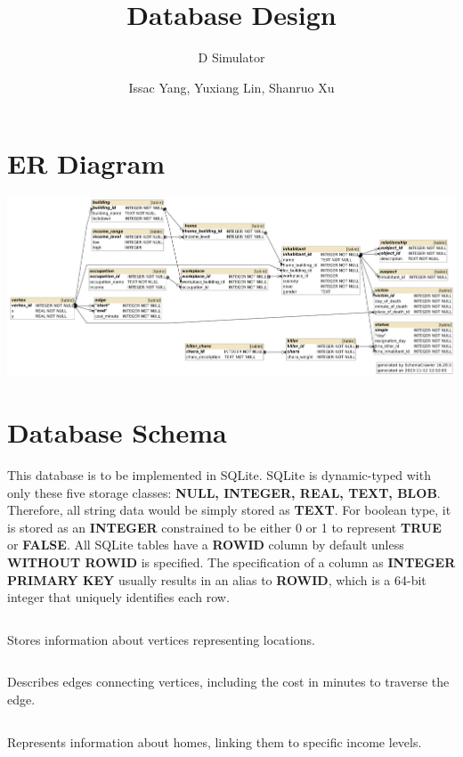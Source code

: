 \documentclass{llncs}
\begin{document}
\title{Database Design}
\subtitle{D Simulator}
\author{Issac Yang, Yuxiang Lin, Shanruo Xu}

\maketitle

\section{ER Diagram}

\includegraphics[width=\textwidth]{diagram.png}

\section{Database Schema}

This database is to be implemented in SQLite. SQLite is dynamic-typed with only these five storage classes: \textbf{NULL, INTEGER, REAL, TEXT, BLOB}. Therefore, all string data would be simply stored as \textbf{TEXT}. For boolean type, it is stored as an \textbf{INTEGER} constrained to be either 0 or 1 to represent \textbf{TRUE} or \textbf{FALSE}. All SQLite tables have a \textbf{ROWID} column by default unless \textbf{WITHOUT ROWID} is specified. The specification of a column as \textbf{INTEGER PRIMARY KEY} usually results in an alias to \textbf{ROWID}, which is a 64-bit integer that uniquely identifies each row.

\inputminted[firstline=1,lastline=6]{sql}{DDL.sql}
Stores information about vertices representing locations.

\inputminted[firstline=8,lastline=15]{sql}{DDL.sql}
Describes edges connecting vertices, including the cost in minutes to traverse the edge.

\inputminted[firstline=17,lastline=23]{sql}{DDL.sql}
Represents information about homes, linking them to specific income levels.
\end{document}
